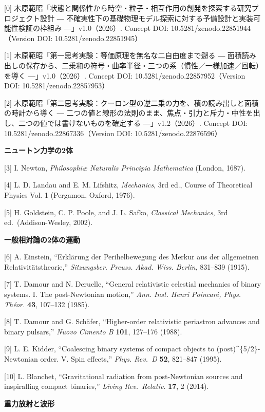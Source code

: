 \documentclass[
  a4paper,
]{ltjsarticle}
\begin{document}
{[}0{]}
木原範昭「状態と関係性から時空・粒子・相互作用の創発を探索する研究プロジェクト設計
― 不確実性下の基礎物理モデル探索に対する予備設計と実装可能性検証の枠組み
―」v1.0（2026）. Concept DOI: 10.5281/zenodo.22851944（Version DOI:
10.5281/zenodo.22851945）

{[}1{]} 木原範昭「第一思考実験：等価原理を無名な二自由度まで遡る ―
面積読み出しの保存から、二乗和の符号・曲率半径・三つの系（慣性／一様加速／回転）を導く
―」v1.0（2026）. Concept DOI: 10.5281/zenodo.22857952（Version DOI:
10.5281/zenodo.22857953）

{[}2{]}
木原範昭「第二思考実験：クーロン型の逆二乗の力を、積の読み出しと面積の時計から導く
―
二つの値と線形の法則のまま、焦点・引力と斥力・中性を出し、二つの値では書けないものを確定する
―」v1.2（2026）. Concept DOI: 10.5281/zenodo.22867336（Version DOI:
10.5281/zenodo.22876596）

\textbf{ニュートン力学の2体}

{[}3{]} I. Newton, \emph{Philosophiæ Naturalis Principia Mathematica}
(London, 1687).

{[}4{]} L. D. Landau and E. M. Lifshitz, \emph{Mechanics}, 3rd ed.,
Course of Theoretical Physics Vol. 1 (Pergamon, Oxford, 1976).

{[}5{]} H. Goldstein, C. P. Poole, and J. L. Safko, \emph{Classical
Mechanics}, 3rd ed.~(Addison-Wesley, 2002).

\textbf{一般相対論の2体の運動}

{[}6{]} A. Einstein, ``Erklärung der Perihelbewegung des Merkur aus der
allgemeinen Relativitätstheorie,'' \emph{Sitzungsber. Preuss. Akad.
Wiss. Berlin}, 831--839 (1915).

{[}7{]} T. Damour and N. Deruelle, ``General relativistic celestial
mechanics of binary systems. I. The post-Newtonian motion,'' \emph{Ann.
Inst. Henri Poincaré, Phys. Théor.} \textbf{43}, 107--132 (1985).

{[}8{]} T. Damour and G. Schäfer, ``Higher-order relativistic periastron
advances and binary pulsars,'' \emph{Nuovo Cimento B} \textbf{101},
127--176 (1988).

{[}9{]} L. E. Kidder, ``Coalescing binary systems of compact objects to
(post)\^{}\{5/2\}-Newtonian order. V. Spin effects,'' \emph{Phys.
Rev.~D} \textbf{52}, 821--847 (1995).

{[}10{]} L. Blanchet, ``Gravitational radiation from post-Newtonian
sources and inspiralling compact binaries,'' \emph{Living Rev.~Relativ.}
\textbf{17}, 2 (2014).

\textbf{重力放射と波形}
\end{document}
